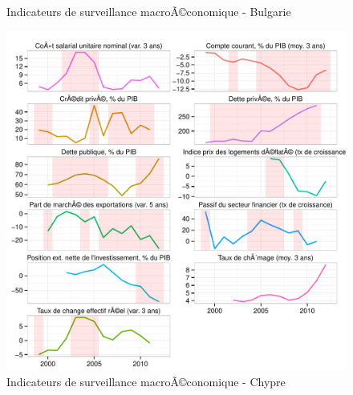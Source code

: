 \documentclass{article}\usepackage[]{graphicx}\usepackage[]{color}
\makeatletter
\def\maxwidth{ %
  \ifdim\Gin@nat@width>\linewidth
    \linewidth
  \else
    \Gin@nat@width
  \fi
}
\newenvironment{knitrout}{}{} %
\makeatother
\begin{document}
\begin{knitrout}
\begin{figure}[p]
{}

\caption[Indicateurs de surveillance macroÃ©conomique - Bulgarie]{Indicateurs de surveillance macroÃ©conomique - Bulgarie\label{fig:byco3}}
\end{figure}

\begin{figure}[p]


{\centering \includegraphics[width=\maxwidth]{figure_graph/byco4} 

}

\caption[Indicateurs de surveillance macroÃ©conomique - Chypre]{Indicateurs de surveillance macroÃ©conomique - Chypre\label{fig:byco4}}
\end{figure}

\begin{figure}[p]



\end{figure}
\end{knitrout}
\end{document}
